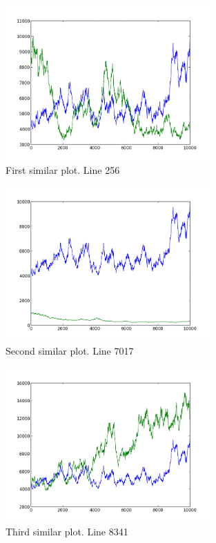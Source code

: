 \begin{figure}[h!]
    \centering
    \includegraphics[width=0.7\textwidth]{images/256.png}
    \caption{First similar plot.  Line 256}
    \label{fig:ex1_1}
\end{figure}

\begin{figure}[h!]
    \centering
    \includegraphics[width=0.7\textwidth]{images/7017.png}
    \caption{Second similar plot.  Line 7017}
    \label{fig:ex1_2}
\end{figure}

\begin{figure}[h!]
    \centering
    \includegraphics[width=0.7\textwidth]{images/8341.png}
    \caption{Third similar plot.  Line 8341}
    \label{fig:ex1_3}
\end{figure}

